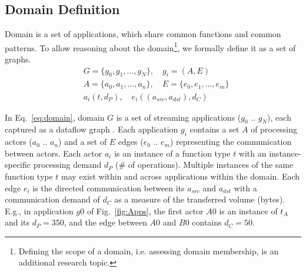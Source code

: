 \subsection{Domain Definition}
\label{sub:dmDefine}
Domain is a set of applications, which share common functions and common patterns\cite{kang1990feature}. To allow reasoning about the domain\footnote{Defining the scope of a domain, i.e. assessing domain membership, is an additional research topic.}, we formally define it as a set of graphs.
\begin{equation}
\begin{split}
\label{eq:domain}
	&G = \{g_{0}, g_{1}, ..., g_{N}\}, \quad g_{i} = (A, E)\\
	&A = \{a_{0}, a_{1}, ..., a_{n}\}, \quad E = \{e_{0}, e_{1}, ..., e_{m}\}\\
	&a_{i} (t, d_{P}), \quad e_{i} ((a_{src}, a_{dst}), d_{C})
\end{split}
\end{equation}

In Eq.~\eqref{eq:domain}, domain $G$ is a set of streaming applications ($g_{0}$ .. $g_{N}$), each captured as a dataflow graph \cite{stuijk2006sdf}. Each application $g_i$ contains a set $A$ of processing actors ($a_0$ .. $a_n$) and a set of $E$ edges ($e_0$ .. $e_m$) representing the communication between actors. Each actor $a_i$ is an instance of a function type $t$ with an instance-specific processing demand $d_{P}$ (\# of operations). Multiple instances of the same function type $t$ may exist within and across applications within the domain. Each edge $e_i$ is the directed communication between its $a_{src}$ and $a_{dst}$ with a communication demand of $d_{C}$ as a measure of the transferred volume (bytes). E.g., in application $g0$ of Fig.~\ref{fig:Apps}, the first actor $A0$ is an instance of $t_{A}$ and its $d_{P} = 350$, and the edge between $A0$ and $B0$ contains $d_{C} = 50$. 

